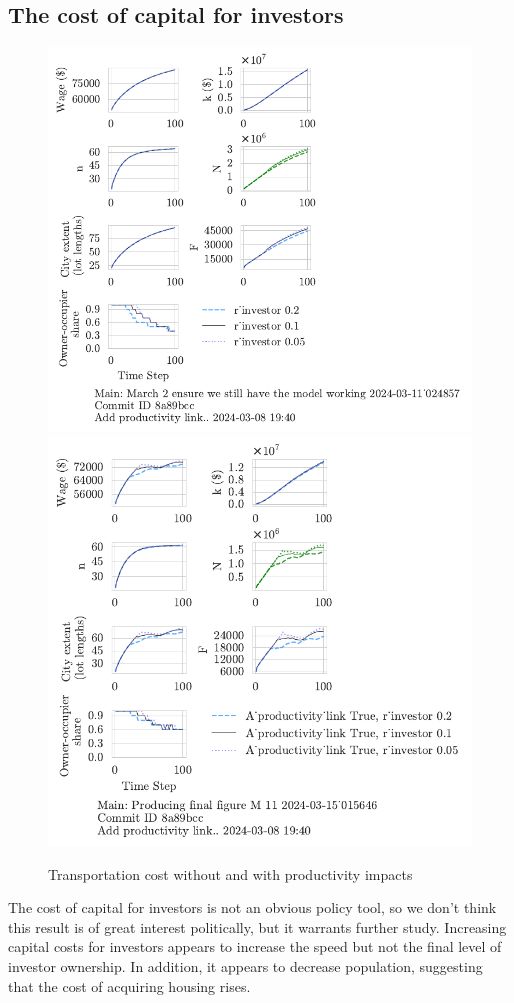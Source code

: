 \subsection{The cost of capital for investors}
\begin{figure}[h!tb] 
    \centering
    \includegraphics[scale=.75, trim={0 1.4cm 4cm 0},clip]{fig/r_investor-Main-024857.pdf} 
    \includegraphics[scale=.75, trim={0 1.4cm 3.5cm 0},clip]{fig/With-productivity_link-r_investor-15_015646.pdf} 
    \caption{Transportation cost without and with productivity impacts}
    \label{fig:Productivity_link_W-WO-Cost-of-capital}
\end{figure}
The cost of capital for investors is not an obvious policy tool, so we don't think this result is of great interest politically, but it warrants further study. Increasing capital costs for investors appears to increase the speed but not the final level of investor ownership.  In addition, it appears to decrease population, suggesting that the cost of acquiring housing rises. 

